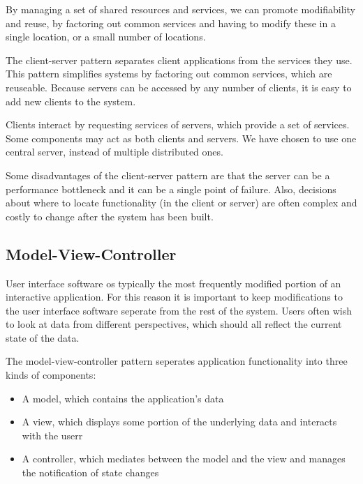 \documentclass{report}
\begin{document}
By managing a set of shared resources and services, we can promote modifiability and reuse, by factoring out common services and having to modify these in a single location, or a small number of locations.

The client-server pattern separates client applications from the services they use. This pattern simplifies systems by factoring out common services, which are reuseable. Because servers can be accessed by any number of clients, it is easy to add new clients to the system.

Clients interact by requesting services of servers, which provide a set of services. Some components may act as both clients and servers. We have chosen to use one central server, instead of multiple distributed ones.

Some disadvantages of the client-server pattern are that the server can be a performance bottleneck and it can be a single point of failure. Also, decisions about where to locate functionality (in the client or server) are often complex and costly to change after the system has been built.

\subsection{Model-View-Controller}
User interface software os typically the most frequently modified portion of an interactive application. For this reason it is important to keep modifications to the user interface software seperate from the rest of the system. Users often wish to look at data from different perspectives, which should all reflect the current state of the data.

The model-view-controller pattern seperates application functionality into three kinds of components:

\begin{itemize}
    \item A model, which contains the application's data
    \item A view, which displays some portion of the underlying data and interacts with the userr
    \item A controller, which mediates between the model and the view and manages the notification of state changes 
\end{itemize}
\end{document}
